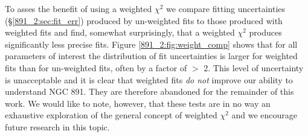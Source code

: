 
To asses the benefit of using a weighted $\chi^2$ we compare fitting
uncertainties (\S\ref{891_2:sec:fit_err}) produced by un-weighted fits to
those produced with weighted fits and find, somewhat surprisingly,
that a weighted $\chi^2$ produces significantly less precise fits.
Figure \ref{891_2:fig:weight_comp} shows that for all parameters of interest
the distribution of fit uncertainties is larger for weighted fits than
for un-weighted fits, often by a factor of $>$ 2. This level of
uncertainty is unacceptable and it is clear that weighted fits
\emph{do not} improve our ability to understand NGC 891. They are
therefore abandoned for the remainder of this work. We would like to
note, however, that these tests are in no way an exhaustive
exploration of the general concept of weighted $\chi^2$ and we
encourage future research in this topic.





